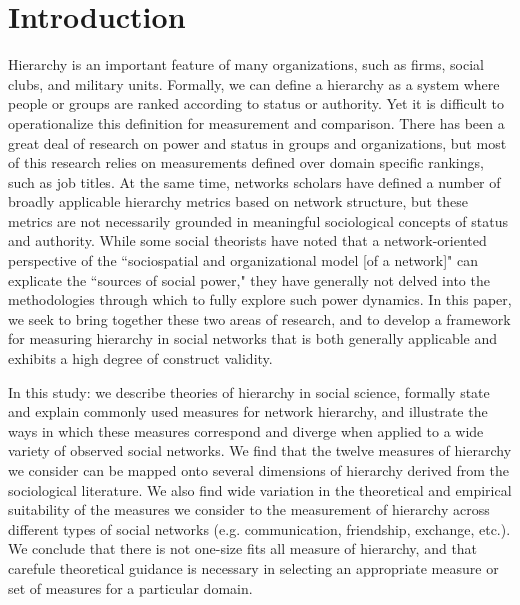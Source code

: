 \documentclass[3p,times]{elsarticle}
\begin{document}
\section{Introduction}
\label{sec:introduction}

Hierarchy is an important feature of many organizations, such as firms, social clubs, and military units. Formally, we can define a hierarchy as a system where people or groups are ranked according to status or authority. Yet it is difficult to operationalize this definition for measurement and comparison. There has been a great deal of research on power and status in groups and organizations, but most of this research relies on measurements defined over domain specific rankings, such as job titles. At the same time, networks scholars have defined a number of broadly applicable hierarchy metrics based on network structure, but these metrics are not necessarily grounded in meaningful sociological concepts of status and authority. While some social theorists have noted that a network-oriented perspective of the ``sociospatial and organizational model [of a network]" can explicate the ``sources of social power," \cite{mann1986sources} they have generally not delved into the methodologies through which to fully explore such power dynamics. In this paper, we seek to bring together these two areas of research, and to develop a framework for measuring hierarchy in social networks that is both generally applicable and exhibits a high degree of construct validity.

In this study: we describe theories of hierarchy in social science, formally state and explain commonly used measures for network hierarchy, and illustrate the ways in which these measures correspond and diverge when applied to a wide variety of observed social networks. We find that the twelve measures of hierarchy we consider can be mapped onto several dimensions of hierarchy derived from the sociological literature. We also find wide variation in the theoretical and empirical suitability of the measures we consider to the measurement of hierarchy across different types of social networks (e.g. communication, friendship, exchange, etc.). We conclude that there is not one-size fits all measure of hierarchy, and that carefule theoretical guidance is necessary in selecting an appropriate measure or set of measures for a particular domain.

\end{document}
